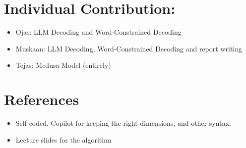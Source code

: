 \documentclass{article}
\begin{document}
\section{Individual Contribution:}
\begin{itemize}
    \item Ojas: LLM Decoding and Word-Constrained Decoding
    \item Muskaan: LLM Decoding, Word-Constrained Decoding and report writing
    \item Tejas: Medusa Model (entirely)
\end{itemize}
\section{References}
\begin{itemize}[noitemsep, nolistsep]
    \item Self-coded, Copilot for keeping the right dimensions, and other syntax. 
    \item Lecture slides for the algorithm
\end{itemize}
\end{document}
